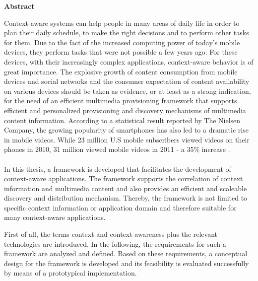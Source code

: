 \thispagestyle{empty}
\vspace*{1.0cm}

\begin{center}
    \textbf{Abstract}
\end{center}

\vspace*{0.5cm}

Context-aware systems can help people in many areas of daily life in order to plan their daily schedule, to make the right decisions  and to perform other tasks for them.
Due to the fact of the increased computing power of today's mobile devices, they perform tasks that were not possible a few years ago. For these devices, with their increasingly complex applications, context-aware behavior is of great importance. The explosive growth of content consumption from mobile devices and social networks and the consumer expectation of content availability on various devices should be taken as evidence, or at least as a strong indication, for the need of an efficient multimedia provisioning framework that supports efficient and personalized provisioning and discovery mechanisms of multimedia content information. According to a statistical result reported by The Nielsen Company, the growing popularity of smartphones has also led to a dramatic rise in mobile videos. While 23 million U.S mobile subscribers viewed videos on their phones in 2010, 31 million viewed mobile videos in 2011 - a 35\% increase \cite{mobile-media-report}. 
\\
\\
In this thesis, a framework is developed that facilitates the development of context-aware applications. The framework supports the correlation of context information and multimedia content and also provides an efficient and scaleable discovery and distribution mechanism. Thereby, the framework is not limited to specific context information or application domain and therefore suitable for many context-aware applications.

First of all, the terms context and context-awareness plus the relevant technologies are introduced. In the following, the requirements for such a framework are analyzed and defined. Based on these requirements, a conceptual design for the framework is developed and its feasibility is evaluated successfully by means of a prototypical implementation.
